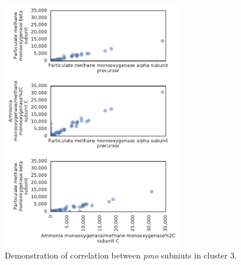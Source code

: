\begin{figure}[H]
\centering
    \includegraphics[width=0.7\textwidth]{./tex/chapter3/figures/170402_correlations_between_pMMO_subunits--set3.pdf}
    \begin{singlespace}
    \caption[Demonstration of correlation between \textit{pmo} subniuts in cluster 3]{
        Demonstration of correlation between \textit{pmo} subniuts in cluster 3.}
    \label{fig:pmo_cor3}
    \end{singlespace}
\end{figure}




